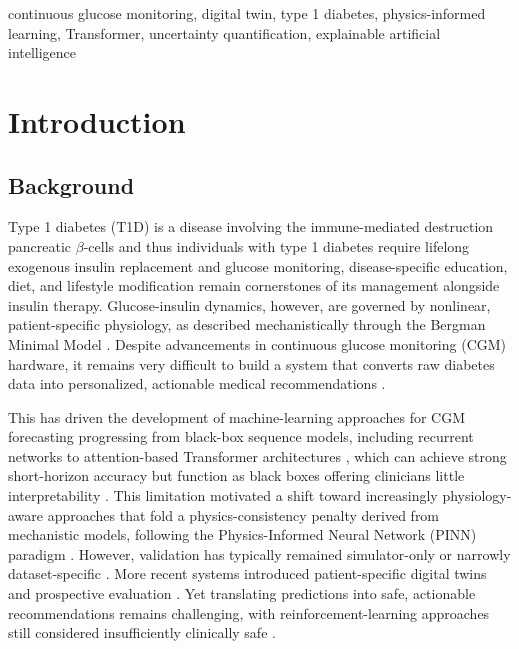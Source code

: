 \documentclass[journal]{IEEEtran}
\begin{document}
\begin{IEEEkeywords}
continuous glucose monitoring, digital twin, type 1 diabetes, physics-informed learning, Transformer, uncertainty quantification, explainable artificial intelligence
\end{IEEEkeywords}

\section{Introduction}

\subsection{Background}

Type 1 diabetes (T1D) is a disease involving the immune-mediated destruction pancreatic $\beta$-cells and thus individuals with type 1 diabetes require lifelong exogenous insulin replacement and glucose monitoring, disease-specific education, diet, and lifestyle modification remain cornerstones of its management alongside insulin therapy. Glucose-insulin dynamics, however, are governed by nonlinear, patient-specific physiology, as described mechanistically through the Bergman Minimal Model \cite{ref1}. Despite advancements in continuous glucose monitoring (CGM) hardware, it remains very difficult to build a system that converts raw diabetes data into personalized, actionable medical recommendations \cite{ref2}.

This has driven the development of machine-learning approaches for CGM forecasting progressing from black-box sequence models, including recurrent networks to attention-based Transformer architectures \cite{ref3,ref4}, which can achieve strong short-horizon accuracy but function as black boxes offering clinicians little interpretability \cite{ref3,ref5}. This limitation motivated a shift toward increasingly physiology-aware approaches that fold a physics-consistency penalty derived from mechanistic models, following the Physics-Informed Neural Network (PINN) paradigm \cite{ref6,ref7,ref8,ref9,ref10}. However, validation has typically remained simulator-only or narrowly dataset-specific \cite{ref7,ref8}. More recent systems introduced patient-specific digital twins and prospective evaluation \cite{ref11,ref12,ref13}. Yet translating predictions into safe, actionable recommendations remains challenging, with reinforcement-learning approaches still considered insufficiently clinically safe \cite{ref14}.
\end{document}
